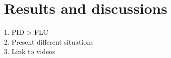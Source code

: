 \section{Results and discussions}

1. PID > FLC \\
2. Present different situations \\
3. Link to videos \\